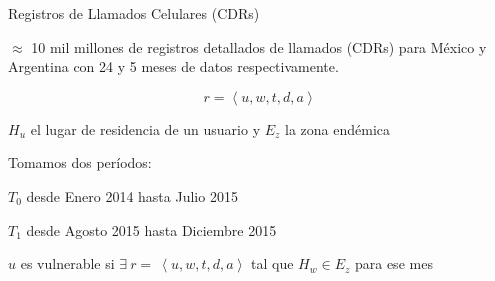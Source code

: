 \documentclass[xcolor=x11names]{beamer}
\begin{document}
\begin{frame}{Registros de Llamados Celulares (CDRs)}

	$\approx$ 10 mil millones de registros detallados de llamados (CDRs) para México y Argentina con 24 y 5 meses de datos respectivamente.

	$$r =\left < u, w, t, d, a \right >$$ 

	\medskip



	$H_u$ el lugar de residencia de un usuario y $E_z$ la zona endémica 
	\smallskip
	
	Tomamos dos períodos:
	\smallskip
	\begin{enumerate*}[label={\alph*)},]
			\item $T_0$ desde Enero 2014 hasta Julio 2015 
			\item $T_1$ desde Agosto 2015 hasta Diciembre 2015
	\end{enumerate*}

	\medskip
	 $u$ es vulnerable si $\exists \ r = \ \left < u, w, t, d, a \right > $ tal que $H_w \in E_z$ para ese mes


\end{frame}
\end{document}
